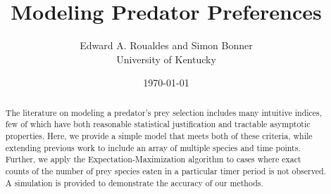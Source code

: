\documentclass[12pt]{article}
\begin{document}
\title{Modeling Predator Preferences}
\author{Edward A. Roualdes and Simon Bonner \\ University of Kentucky}
\date{\today}
\maketitle

\begin{abstract}
The literature on modeling a predator's prey selection includes many intuitive indices, few of which have both reasonable statistical justification and tractable asymptotic properties.  Here, we provide a simple model that meets both of these criteria, while extending previous work to include an array of multiple species and time points.  Further, we apply the Expectation-Maximization algorithm to cases where exact counts of the number of prey species eaten in a particular timer period is not observed.  A simulation is provided to demonstrate the accuracy of our methods.
\end{abstract}









\end{document}
